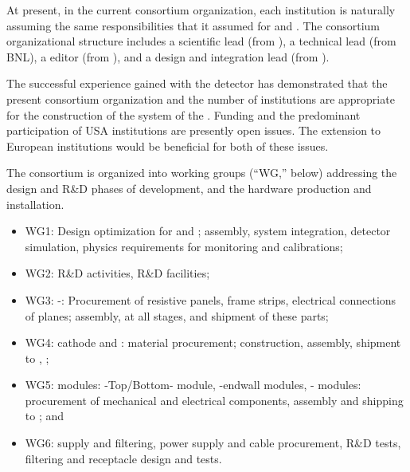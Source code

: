 At present, in the  current consortium organization, each institution is naturally assuming the same responsibilities that it assumed for %
 and . The %
consortium organizational structure includes a scientific lead (from ), a technical lead (from BNL), a  editor (from ), and a  design and integration lead (from ). 

The successful experience gained with the  detector has demonstrated that the present  consortium organization and the number of institutions are appropriate for the construction of the  system of the . Funding and the predominant participation of USA institutions are presently open issues. The extension to European institutions would be beneficial for both of these issues. 

 The consortium is organized into working groups (``WG,'' below) addressing the design and  R\&D phases of development, and the hardware production and installation.

\begin{itemize}
\item WG1: Design optimization for  and ; assembly, system integration, detector simulation, physics requirements for monitoring and calibrations; %
\item WG2: R\&D activities, R\&D facilities; %
\item WG3: -: Procurement of resistive panels, frame strips, electrical connections of planes; assembly,  at all stages, and shipment of these parts; %
\item WG4:  cathode and :  material procurement; construction, assembly, shipment to  %
, ; %
\item WG5:  modules: -Top/Bottom- module, -endwall modules, - modules: procurement of mechanical and electrical components, assembly and shipping to ; and  %
\item WG6:  supply and filtering,  power supply and cable procurement, R\&D tests, filtering and receptacle design and tests. %
\end{itemize}

